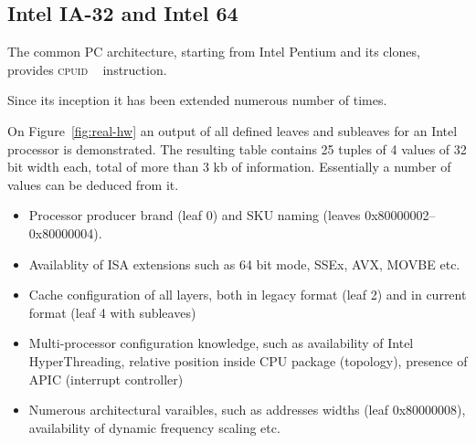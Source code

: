 \documentclass[a4paper,10pt,oneside,unicode]{article}
\newcommand{\cpuid}{\textsc{cpuid} }
\begin{document}
\subsection{Intel IA-32 and Intel 64}

The common PC architecture, starting from Intel Pentium and its clones, provides \cpuid~\cite{intelmanual-7vols, amd-sdm-vol1} instruction. 

Since its inception it has been extended numerous number of times.


On Figure~\ref{fig:real-hw} an output of all defined leaves and subleaves for an Intel processor is demonstrated. The resulting table contains 25 tuples of 4 values of 32 bit width each, total of more than 3 kb of information. Essentially a number of values can be deduced from it.
\begin{itemize}
    \item Processor producer brand (leaf 0) and SKU naming (leaves 0x80000002--0x80000004).
    \item Availablity of ISA extensions such as 64 bit mode, SSEx, AVX, MOVBE etc.
    \item Cache configuration of all layers, both in legacy format (leaf 2) and in current format (leaf 4 with subleaves)
    \item Multi-processor configuration knowledge, such as availability of Intel HyperThreading, relative position inside CPU package (topology), presence of APIC (interrupt controller)
    \item Numerous architectural varaibles, such as addresses widths (leaf 0x80000008), availability of dynamic frequency scaling etc.
\end{itemize}
\end{document}
